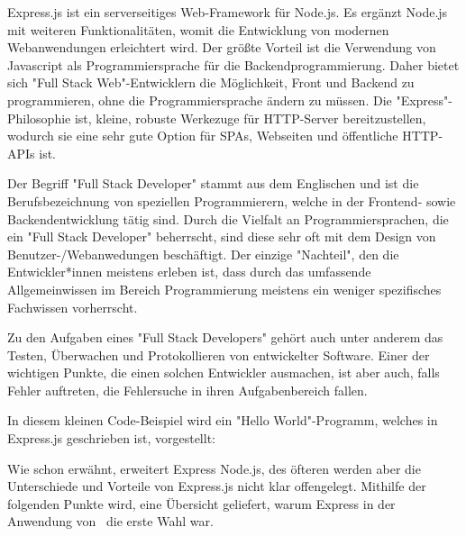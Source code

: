  \label{sec:express}

Express.js ist ein serverseitiges Web-Framework für Node.js. Es ergänzt Node.js mit weiteren Funktionalitäten, womit die Entwicklung von modernen Webanwendungen erleichtert wird. Der größte Vorteil ist die Verwendung von Javascript als Programmiersprache für die Backendprogrammierung. Daher bietet sich "Full Stack Web"-Entwicklern die Möglichkeit, Front und Backend zu programmieren, ohne die Programmiersprache ändern zu müssen. Die "Express"-Philosophie ist, kleine, robuste Werkezuge für HTTP-Server bereitzustellen, wodurch sie eine sehr gute Option für SPAs, Webseiten und öffentliche HTTP-APIs ist. \cite{Express}

Der Begriff "Full Stack Developer" stammt aus dem Englischen und ist die Berufsbezeichnung von speziellen Programmierern, welche in der Frontend- sowie Backendentwicklung tätig sind. Durch die Vielfalt an Programmiersprachen, die ein "Full Stack Developer" beherrscht, sind diese sehr oft mit dem Design von Benutzer-/Webanwedungen beschäftigt. Der einzige "Nachteil", den die Entwickler*innen meistens erleben ist, dass durch das umfassende Allgemeinwissen im Bereich Programmierung meistens ein weniger spezifisches Fachwissen vorherrscht. 

Zu den Aufgaben eines "Full Stack Developers" gehört auch unter anderem das Testen, Überwachen und Protokollieren von entwickelter Software. Einer der wichtigen Punkte, die einen solchen Entwickler ausmachen, ist aber auch, falls Fehler auftreten, die Fehlersuche in ihren Aufgabenbereich fallen. \cite{FullStack}

\pagebreak
{}

In diesem kleinen Code-Beispiel wird ein "Hello World"-Programm, welches in Express.js geschrieben ist, vorgestellt:


\cite{Express}


Wie schon erwähnt, erweitert Express Node.js, des öfteren werden aber die Unterschiede und Vorteile von Express.js nicht klar offengelegt. Mithilfe der folgenden Punkte wird, eine Übersicht geliefert, warum Express in der Anwendung von \ZELIA\ die erste Wahl war.

